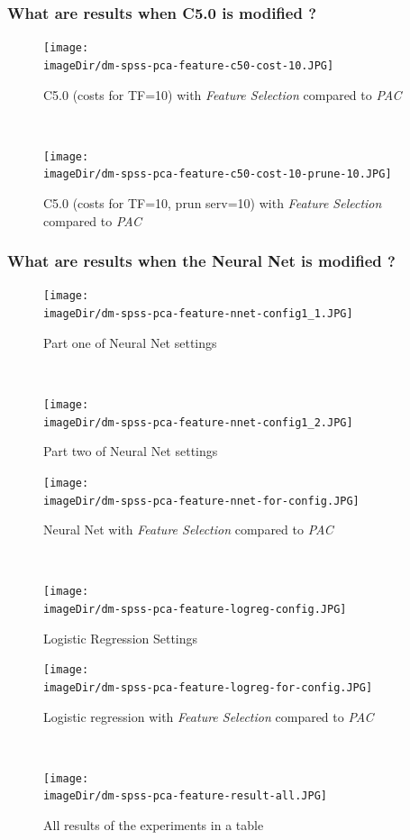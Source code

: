 \documentclass[11pt, a4paper, twoside]{article}   	%
\newcommand{\imageDir}{./images/}
\begin{document}
\subsubsection{What are results when C5.0 is modified ? }

\begin{figure}[h]
\centering
\texttt{[image: \\imageDir/dm-spss-pca-feature-c50-cost-10.JPG]}
\caption{C5.0 (costs for TF=10) with \emph{Feature Selection} compared to \emph{PAC}}
\end{figure}
\ \newpage

\begin{figure}[h]
\centering
\texttt{[image: \\imageDir/dm-spss-pca-feature-c50-cost-10-prune-10.JPG]}
\caption{C5.0 (costs for TF=10, prun serv=10) with \emph{Feature Selection} compared to \emph{PAC}}
\end{figure}

\subsubsection{What are results when the Neural Net is modified ? }
\begin{figure}[h]
\centering
\texttt{[image: \\imageDir/dm-spss-pca-feature-nnet-config1\_1.JPG]}
\caption{Part one of Neural Net settings}
\end{figure}
\ \newpage

\begin{figure}[h]
\centering
\texttt{[image: \\imageDir/dm-spss-pca-feature-nnet-config1\_2.JPG]}
\caption{Part two of Neural Net settings}
\end{figure}

\begin{figure}[h]
\centering
\texttt{[image: \\imageDir/dm-spss-pca-feature-nnet-for-config.JPG]}
\caption{Neural Net with \emph{Feature Selection} compared to \emph{PAC}}
\end{figure}
\ \newpage

\begin{figure}[h]
\centering
\texttt{[image: \\imageDir/dm-spss-pca-feature-logreg-config.JPG]}
\caption{Logistic Regression Settings}
\end{figure}

\begin{figure}[h]
\centering
\texttt{[image: \\imageDir/dm-spss-pca-feature-logreg-for-config.JPG]}
\caption{Logistic regression with \emph{Feature Selection} compared to \emph{PAC}}
\end{figure}
\ \newline

\begin{figure}
\centering
\texttt{[image: \\imageDir/dm-spss-pca-feature-result-all.JPG]}
\caption{All results of the experiments in a table}
\end{figure}
\end{document}
